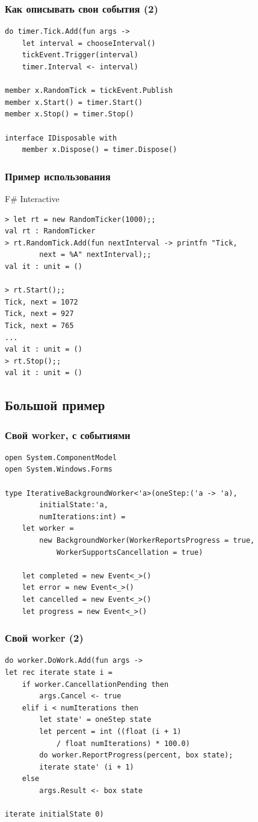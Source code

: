\documentclass[xetex,mathserif,serif]{beamer}
\begin{document}
	\begin{frame}[fragile]
		\frametitle{Как описывать свои события (2)}
		\begin{verbatim}
do timer.Tick.Add(fun args ->
    let interval = chooseInterval()
    tickEvent.Trigger(interval)
    timer.Interval <- interval)

member x.RandomTick = tickEvent.Publish
member x.Start() = timer.Start()
member x.Stop() = timer.Stop()

interface IDisposable with
    member x.Dispose() = timer.Dispose()
		\end{verbatim}
	\end{frame}

	\begin{frame}[fragile]
		\frametitle{Пример использования}
		\begin{alertblock}{F\# Interactive}
			\begin{verbatim}
> let rt = new RandomTicker(1000);;
val rt : RandomTicker
> rt.RandomTick.Add(fun nextInterval -> printfn "Tick, 
        next = %A" nextInterval);;
val it : unit = ()

> rt.Start();;
Tick, next = 1072
Tick, next = 927
Tick, next = 765
...
val it : unit = ()
> rt.Stop();;
val it : unit = ()
			\end{verbatim}
		\end{alertblock}
	\end{frame}

	\subsection{Большой пример}

	\begin{frame}[fragile]
		\frametitle{Свой worker, с событиями}
		\begin{verbatim}
open System.ComponentModel
open System.Windows.Forms

type IterativeBackgroundWorker<'a>(oneStep:('a -> 'a),
        initialState:'a,
        numIterations:int) =
    let worker =
        new BackgroundWorker(WorkerReportsProgress = true,
            WorkerSupportsCancellation = true)

    let completed = new Event<_>()
    let error = new Event<_>()
    let cancelled = new Event<_>()
    let progress = new Event<_>()
		\end{verbatim}
\end{frame}

	\begin{frame}[fragile]
		\frametitle{Свой worker (2)}
		\begin{verbatim}
do worker.DoWork.Add(fun args ->
let rec iterate state i =
    if worker.CancellationPending then
        args.Cancel <- true
    elif i < numIterations then
        let state' = oneStep state
        let percent = int ((float (i + 1) 
            / float numIterations) * 100.0)
        do worker.ReportProgress(percent, box state);
        iterate state' (i + 1)
    else
        args.Result <- box state

iterate initialState 0)
		\end{verbatim}
	\end{frame}
\end{document}
